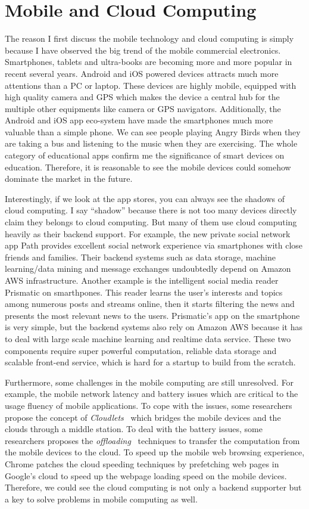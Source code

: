 \section{Mobile and Cloud Computing}
The reason I first discuss the mobile technology and cloud computing is simply because I have observed the big trend of the mobile commercial electronics. Smartphones, tablets and ultra-books are becoming more and more popular in recent several years. Android and iOS powered devices attracts much more attentions than a PC or laptop. These devices are highly mobile, equipped with high quality camera and GPS which makes the device a central hub for the multiple other equipments like camera or GPS navigators. Additionally, the Android and iOS app eco-system have made the smartphones much more valuable than a simple phone. We can see people playing Angry Birds when they are taking a bus and listening to the music when they are exercising. The whole category of educational apps confirm me the significance of smart devices on education. Therefore, it is reasonable to see the mobile devices could somehow dominate the market in the future.

Interestingly, if we look at the app stores, you can always see the shadows of cloud computing. I say ``shadow'' because there is not too many devices directly claim they belongs to cloud computing. But many of them use cloud computing heavily as their backend support. For example, the new private social network app Path\cite{path} provides excellent social network experience via smartphones with close friends and families. Their backend systems such as data storage, machine learning/data mining and message exchanges undoubtedly depend on Amazon AWS infrastructure. Another example is the intelligent social media reader Prismatic\cite{prismatic} on smarthpones. This reader learns the user's interests and topics among numerous posts and streams online, then it starts filtering the news and presents the most relevant news to the users. Prismatic's app on the smartphone is very simple, but the backend systems also rely on Amazon AWS because it has to deal with large scale machine learning and realtime data service. These two components require super powerful computation, reliable data storage and scalable front-end service, which is hard for a startup to build from the scratch. 

Furthermore, some challenges in the mobile computing are still unresolved. For example, the mobile network latency and battery issues which are critical to the usage fluency of mobile applications. To cope with the issues, some researchers propose the concept of \emph{Cloudlets}~\cite{satyanarayanan2009case} which bridges the mobile devices and the clouds through a middle station. To deal with the battery issues, some researchers proposes the \emph{offloading}~\cite{kumar2010cloud} techniques to transfer the computation from the mobile devices to the cloud. To speed up the mobile web browsing experience, Chrome patches the cloud speeding techniques by prefetching web pages in Google's cloud to speed up the webpage loading speed on the mobile devices. Therefore, we could see the cloud computing is not only a backend supporter but a key to solve problems in mobile computing as well.

